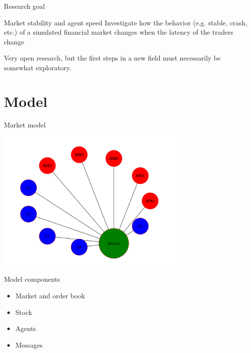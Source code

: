 \documentclass[14pt]{beamer}
\begin{document}
\begin{frame}{Research goal}
\begin{block}{Market stability and agent speed}
Investigate how the behavior (e.g. stable, crash, etc.) of a simulated financial market changes when the latency of the traders change
\end{block}
Very open research, but the first steps in a new field must necessarily be somewhat exploratory.
\end{frame}


%






\section{Model}
\begin{frame}
\tableofcontents[currentsection]
\end{frame}

\begin{frame}{Market model}
\begin{center}
\includegraphics[width=0.7\textwidth]{graph.png}
\end{center}
\end{frame}

\begin{frame}{Model components}
\begin{itemize}
\item Market and order book
\item Stock
\item Agents
\item Messages
\end{itemize}
\end{frame}
\end{document}

